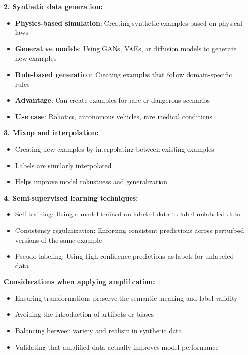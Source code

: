\documentclass[12pt]{article}
\begin{document}
\begin{enumerate}
\begin{tcolorbox}[colback=blue!5!white,colframe=blue!75!black,title={Solution}]
    \textbf{2. Synthetic data generation:}
    \begin{itemize}
        \item \textbf{Physics-based simulation}: Creating synthetic examples based on physical laws
        \item \textbf{Generative models}: Using GANs, VAEs, or diffusion models to generate new examples
        \item \textbf{Rule-based generation}: Creating examples that follow domain-specific rules
        \item \textbf{Advantage}: Can create examples for rare or dangerous scenarios
        \item \textbf{Use case}: Robotics, autonomous vehicles, rare medical conditions
    \end{itemize}
    
    \textbf{3. Mixup and interpolation:}
    \begin{itemize}
        \item Creating new examples by interpolating between existing examples
        \item Labels are similarly interpolated
        \item Helps improve model robustness and generalization
    \end{itemize}
    
    \textbf{4. Semi-supervised learning techniques:}
    \begin{itemize}
        \item Self-training: Using a model trained on labeled data to label unlabeled data
        \item Consistency regularization: Enforcing consistent predictions across perturbed versions of the same example
        \item Pseudo-labeling: Using high-confidence predictions as labels for unlabeled data
    \end{itemize}
    
    \textbf{Considerations when applying amplification:}
    \begin{itemize}
        \item Ensuring transformations preserve the semantic meaning and label validity
        \item Avoiding the introduction of artifacts or biases
        \item Balancing between variety and realism in synthetic data
        \item Validating that amplified data actually improves model performance
    \end{itemize}
    

\end{tcolorbox}
\end{enumerate}
\end{document}
